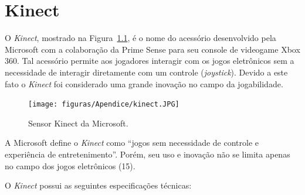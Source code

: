 \chapter{Kinect}
\label{sec:kinect}


O \textit{Kinect}, mostrado na Figura~\ref{kinect}, é o nome do acessório desenvolvido pela Microsoft com a colaboração da Prime Sense para seu console de videogame Xbox 360. Tal acessório permite aos jogadores interagir com os jogos eletrônicos sem a necessidade de interagir diretamente com um controle (\textit{joystick}). Devido a este fato o \textit{Kinect} foi considerado uma grande inovação no campo da jogabilidade.

	\begin{figure}[hbt]
		\begin{center}
		\texttt{[image: figuras/Apendice/kinect.JPG]}
		\end{center}
		\caption{Sensor Kinect da Microsoft.}
		\label{kinect}
	\end{figure}

	A Microsoft define o \textit{Kinect} como ``jogos sem necessidade de controle e experiência de entretenimento''. Porém, seu uso e inovação não se limita apenas no campo dos jogos eletrônicos (15).

	O \textit{Kinect} possui as seguintes especificações técnicas:

